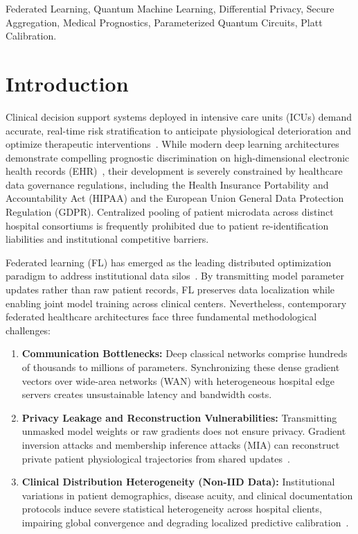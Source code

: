\documentclass[conference]{IEEEtran}
\begin{document}
\begin{IEEEkeywords}
Federated Learning, Quantum Machine Learning, Differential Privacy, Secure Aggregation, Medical Prognostics, Parameterized Quantum Circuits, Platt Calibration.
\end{IEEEkeywords}

\section{Introduction}
Clinical decision support systems deployed in intensive care units (ICUs) demand accurate, real-time risk stratification to anticipate physiological deterioration and optimize therapeutic interventions~\cite{rajkomar2018scalable,harutyunyan2019multitask}. While modern deep learning architectures demonstrate compelling prognostic discrimination on high-dimensional electronic health records (EHR)~\cite{johnson2016mimic,pollard2018eicu}, their development is severely constrained by healthcare data governance regulations, including the Health Insurance Portability and Accountability Act (HIPAA) and the European Union General Data Protection Regulation (GDPR). Centralized pooling of patient microdata across distinct hospital consortiums is frequently prohibited due to patient re-identification liabilities and institutional competitive barriers.

Federated learning (FL) has emerged as the leading distributed optimization paradigm to address institutional data silos~\cite{mcmahan2017communication,kairouz2021advances}. By transmitting model parameter updates rather than raw patient records, FL preserves data localization while enabling joint model training across clinical centers. Nevertheless, contemporary federated healthcare architectures face three fundamental methodological challenges:
\begin{enumerate}
    \item \textbf{Communication Bottlenecks:} Deep classical networks comprise hundreds of thousands to millions of parameters. Synchronizing these dense gradient vectors over wide-area networks (WAN) with heterogeneous hospital edge servers creates unsustainable latency and bandwidth costs.
    \item \textbf{Privacy Leakage and Reconstruction Vulnerabilities:} Transmitting unmasked model weights or raw gradients does not ensure privacy. Gradient inversion attacks and membership inference attacks (MIA) can reconstruct private patient physiological trajectories from shared updates~\cite{abadi2016deep,bonawitz2017practical}.
    \item \textbf{Clinical Distribution Heterogeneity (Non-IID Data):} Institutional variations in patient demographics, disease acuity, and clinical documentation protocols induce severe statistical heterogeneity across hospital clients, impairing global convergence and degrading localized predictive calibration~\cite{li2020federated,vancalster2016calibration}.
\end{enumerate}
\end{document}
